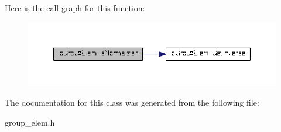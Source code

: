 Here is the call graph for this function\-:
\nopagebreak
\begin{figure}[H]
\begin{center}
\leavevmode
\includegraphics[width=350pt]{classcGroupElem_ab01a807aff26daecd39cea6837b01e8e_cgraph}
\end{center}
\end{figure}




The documentation for this class was generated from the following file\-:\begin{DoxyCompactItemize}
\item 
group\-\_\-elem.\-h\end{DoxyCompactItemize}
